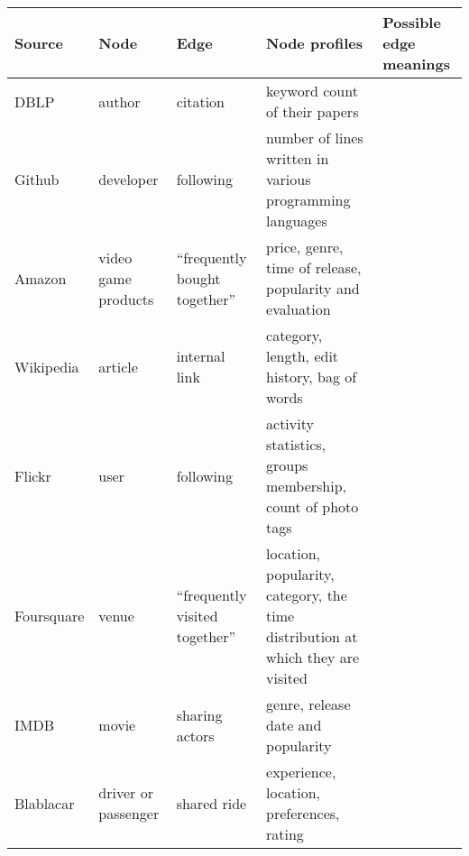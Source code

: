 \noindent\begin{tabulary}{\textwidth}{lLLLL}
  \toprule
  Source & Node & Edge & Node profiles & Possible edge meanings \\
  \midrule
  DBLP & author & citation & keyword count of their papers & \\
  Github & developer & following & number of lines written in various programming languages & \\
  Amazon & video game products & \enquote{frequently bought together} & price, genre, time of release, popularity and evaluation & \\
  Wikipedia & article & internal link & category, length, edit history, bag of words & \\
  Flickr & user & following & activity statistics, groups membership, count of photo tags & \\
  Foursquare & venue & \enquote{frequently visited together} & location, popularity, category, the time distribution at which they are visited & \\
  IMDB & movie & sharing actors & genre, release date and popularity & \\
  Blablacar & driver or passenger & shared ride & experience, location, preferences, rating & \\
  \bottomrule
\end{tabulary}

